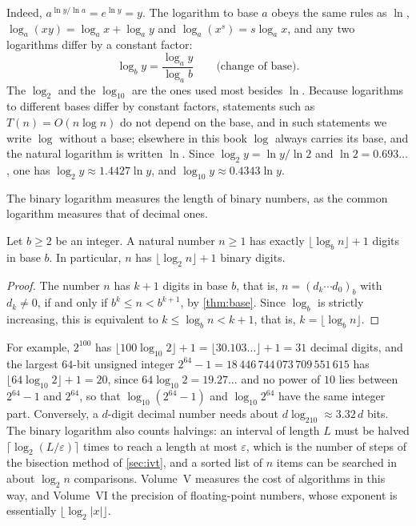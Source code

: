 Indeed, $a^{\ln y/\ln a}=e^{\ln y}=y$. The logarithm to base $a$ obeys the same rules as $\ln$, $\log_a(xy)=\log_ax+\log_ay$ and $\log_a(x^s)=s\log_ax$, and any two logarithms differ by a constant factor:
\[
\log_by=\frac{\log_ay}{\log_ab}\qquad\text{(change of base)}.
\]
The  $\log_2$ and the  $\log_{10}$ are the ones used most besides $\ln$. Because logarithms to different bases differ by constant factors, statements such as $T(n)=O(n\log n)$ do not depend on the base, and in such statements we write $\log$ without a base; elsewhere in this book $\log$ always carries its base, and the natural logarithm is written $\ln$. Since $\log_2y=\ln y/\ln2$ and $\ln2=0.693\ldots$, one has $\log_2y\approx1.4427\ln y$, and $\log_{10}y\approx0.4343\ln y$.

The binary logarithm measures the length of binary numbers, as the common logarithm measures that of decimal ones.

\begin{proposition}
\label{prop:digit-count}
Let $b\ge2$ be an integer. A natural number $n\ge1$ has exactly $\lfloor\log_bn\rfloor+1$ digits in base $b$. In particular, $n$ has $\lfloor\log_2n\rfloor+1$ binary digits.
\end{proposition}

\begin{proof}
The number $n$ has $k+1$ digits in base $b$, that is, $n=(d_k\cdots d_0)_b$ with $d_k\ne0$, if and only if $b^k\le n<b^{k+1}$, by \cref{thm:base}. Since $\log_b$ is strictly increasing, this is equivalent to $k\le\log_bn<k+1$, that is, $k=\lfloor\log_bn\rfloor$.
\end{proof}

For example, $2^{100}$ has $\lfloor100\log_{10}2\rfloor+1=\lfloor30.103\ldots\rfloor+1=31$ decimal digits, and the largest $64$-bit unsigned integer $2^{64}-1=18\,446\,744\,073\,709\,551\,615$ has $\lfloor64\log_{10}2\rfloor+1=20$, since $64\log_{10}2=19.27\ldots$ and no power of $10$ lies between $2^{64}-1$ and $2^{64}$, so that $\log_{10}(2^{64}-1)$ and $\log_{10}2^{64}$ have the same integer part. Conversely, a $d$-digit decimal number needs about $d\log_210\approx3.32\,d$ bits. The binary logarithm also counts halvings: an interval of length $L$ must be halved $\lceil\log_2(L/\varepsilon)\rceil$ times to reach a length at most $\varepsilon$, which is the number of steps of the bisection method of \cref{sec:ivt}, and a sorted list of $n$ items can be searched in about $\log_2n$ comparisons. Volume~V measures the cost of algorithms in this way, and Volume~VI the precision of floating-point numbers, whose exponent is essentially $\lfloor\log_2|x|\rfloor$.

